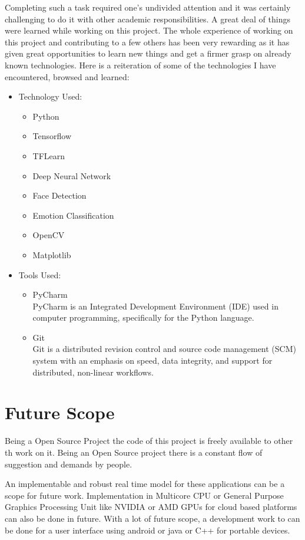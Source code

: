 Completing such a task required one’s undivided attention and it was certainly challenging to do it with other academic responsibilities. A great deal of things were learned while working on this project.  The whole experience of working on this project and contributing to a few others has been very rewarding as it has given great opportunities to learn new things and get a firmer grasp on already known technologies. Here is a reiteration of some of the technologies I have encountered, browsed and learned:
\begin{itemize}
	\item Technology Used:
	\begin{itemize}
		\item Python
		\item Tensorflow
		\item TFLearn
		\item Deep Neural Network
		\item Face Detection
		\item Emotion Classification
		\item OpenCV
		\item Matplotlib
	\end{itemize}
	\item Tools Used:
	\begin{itemize}
		\item PyCharm\\PyCharm is an Integrated Development Environment (IDE) used in computer programming, specifically for the Python language.
		\item Git\\Git is a distributed revision control and source code management (SCM) system with an emphasis on speed, data integrity, and support for distributed, non-linear workflows.
	\end{itemize}
\end{itemize}

\section{Future Scope}
Being a Open Source Project the code of this project is freely available to other th work on it. Being an Open Source project there is a constant flow of suggestion and demands by people.

An implementable and robust real time model for these applications can be a scope for future work. Implementation in Multicore CPU or General Purpose Graphics Processing Unit like NVIDIA or AMD GPUs for cloud based platforms can also be done in future. With a lot of future scope, a development work to can be done for a user interface using android or java or C++ for portable devices. 


